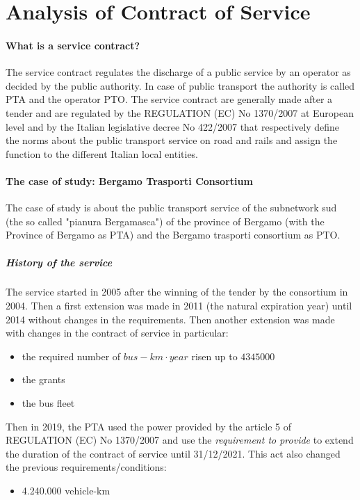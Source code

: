\section{Analysis of Contract of Service}
\paragraph{What is a service contract?}
The service contract regulates the discharge of a public service by an operator as decided by the public authority. In case of public transport the authority is called PTA and the operator PTO. The service contract are generally made after a tender and are regulated by the REGULATION (EC) No 1370/2007 at European level and by the Italian legislative decree No 422/2007 that respectively define the norms about the public transport service on road and rails and assign the function to the different Italian local entities.

\paragraph{The case of study: Bergamo Trasporti Consortium}
The case of study is about the public transport service of the subnetwork sud (the so called "pianura Bergamasca") of the province of Bergamo (with the Province of Bergamo as PTA) and the Bergamo trasporti consortium as PTO.

\subparagraph{History of the service} The service started in 2005 after the winning of the tender by the consortium in 2004. Then a first extension was made in 2011 (the natural expiration year) until 2014 without changes in the requirements. Then another extension was made with changes in the contract of service in particular:
\begin{itemize}
    \item the required number of $bus-km\cdot year$ risen up to $4345000$
    \item the grants
    \item the bus fleet
\end{itemize}

Then in 2019, the PTA used the power provided by the article 5 of REGULATION (EC) No 1370/2007 and use the \emph{requirement to provide} to extend the duration of the contract of service until 31/12/2021. This act also changed the previous requirements/conditions:
\begin{itemize}
    \item 4.240.000 vehicle-km
\end{itemize}


